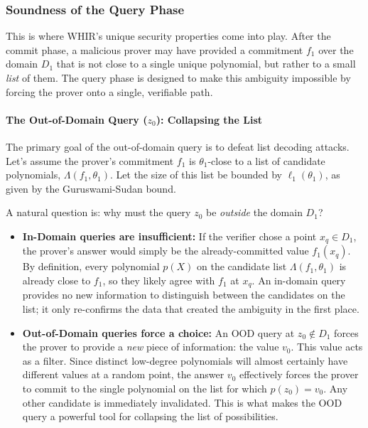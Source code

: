 \documentclass{article}
\begin{document}
\subsubsection{Soundness of the Query Phase}
This is where WHIR's unique security properties come into play. After the commit phase, a malicious prover may have provided a commitment $f_1$ over the domain $D_1$ that is not close to a single unique polynomial, but rather to a small \textit{list} of them. The query phase is designed to make this ambiguity impossible by forcing the prover onto a single, verifiable path.

\paragraph{The Out-of-Domain Query ($z_0$): Collapsing the List}
The primary goal of the out-of-domain query is to defeat list decoding attacks. Let's assume the prover's commitment $f_1$ is $\theta_1$-close to a list of candidate polynomials, $\Lambda(f_1, \theta_1)$. Let the size of this list be bounded by $\ell_1(\theta_1)$, as given by the Guruswami-Sudan bound.

\begin{tcolorbox}[breakable, title={Why Out-of-Domain? The Power of a New Data Point}]
A natural question is: why must the query $z_0$ be \textit{outside} the domain $D_1$?

\begin{itemize}
    \item \textbf{In-Domain queries are insufficient:} If the verifier chose a point $x_q \in D_1$, the prover's answer would simply be the already-committed value $f_1(x_q)$. By definition, every polynomial $p(X)$ on the candidate list $\Lambda(f_1, \theta_1)$ is already close to $f_1$, so they likely agree with $f_1$ at $x_q$. An in-domain query provides no new information to distinguish between the candidates on the list; it only re-confirms the data that created the ambiguity in the first place.

    \item \textbf{Out-of-Domain queries force a choice:} An OOD query at $z_0 \notin D_1$ forces the prover to provide a \textit{new} piece of information: the value $v_0$. This value acts as a filter. Since distinct low-degree polynomials will almost certainly have different values at a random point, the answer $v_0$ effectively forces the prover to commit to the single polynomial on the list for which $p(z_0)=v_0$. Any other candidate is immediately invalidated. This is what makes the OOD query a powerful tool for collapsing the list of possibilities.
\end{itemize}
\end{tcolorbox}
\end{document}
